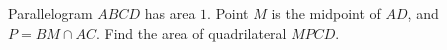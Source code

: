 Parallelogram $ABCD$ has area $1$. Point $M$ is the midpoint of $AD$, and $P=BM\cap AC$. Find the area of quadrilateral $MPCD$.
